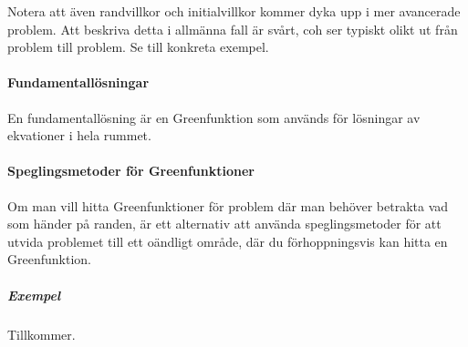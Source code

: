 Notera att även randvillkor och initialvillkor kommer dyka upp i mer avancerade problem. Att beskriva detta i allmänna fall är svårt, coh ser typiskt olikt ut från problem till problem. Se till konkreta exempel.

\paragraph{Fundamentallösningar}
En fundamentallösning är en Greenfunktion som används för lösningar av ekvationer i hela rummet.

\paragraph{Speglingsmetoder för Greenfunktioner}
Om man vill hitta Greenfunktioner för problem där man behöver betrakta vad som händer på randen, är ett alternativ att använda speglingsmetoder för att utvida problemet till ett oändligt område, där du förhoppningsvis kan hitta en Greenfunktion.

\subparagraph{Exempel}
Tillkommer.